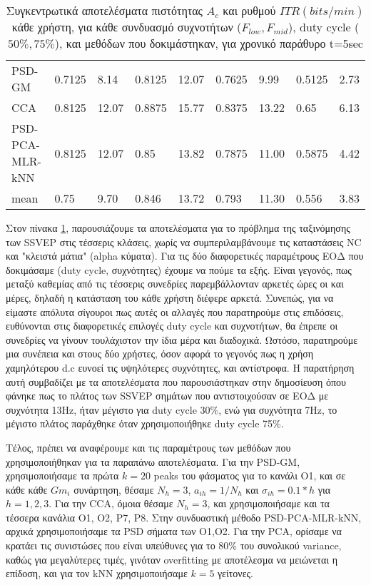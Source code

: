 \documentclass[11pt,a4paper,english,greek,twoside]{../Thesis}
\begin{document}
\begin{table}[H]
\begin{tabular}{ |p{4cm}||p{1cm}|p{1cm}|p{1cm}|p{1cm}|p{1cm}|p{1cm}|p{1cm}|p{1cm}|}
        PSD-GM          & 0.7125& 8.14&    0.8125& 12.07& 0.7625&  9.99&   0.5125&  2.73 \\
        CCA             & 0.8125& 12.07&   0.8875& 15.77& 0.8375& 13.22&   0.65&  6.13 \\
        PSD-PCA-MLR-kNN & 0.8125& 12.07&    0.85& 13.82&  0.7875& 11.00&  0.5875& 4.42 \\
        \hline
        mean            &  0.75&  9.70&   0.846& 13.72&   0.793& 11.30& 0.556& 3.83 \\
        \hline
    \end{tabular}
    \caption{Συγκεντρωτικά αποτελέσματα πιστότητας $A_c$ και ρυθμού $ITR (bits/min)$ κάθε χρήστη, για κάθε συνδυασμό συχνοτήτων ($F_{low}, F_{mid}$), duty cycle ($50\%, 75\%$), και μεθόδων που δοκιμάστηκαν, για χρονικό παράθυρο t=5sec}
    \label{tab:full_results}
\end{table}

\par Στον πίνακα \ref{tab:full_results}, παρουσιάζουμε τα αποτελέσματα για το πρόβλημα της ταξινόμησης των SSVEP στις τέσσερις κλάσεις, χωρίς να συμπεριλαμβάνουμε τις καταστάσεις NC και "κλειστά μάτια" (alpha κύματα). Για τις δύο διαφορετικές παραμέτρους ΕΟΔ που δοκιμάσαμε (duty cycle, συχνότητες) έχουμε να πούμε τα εξής. Είναι γεγονός, πως μεταξύ καθεμίας από τις τέσσερις συνεδρίες παρεμβάλλονταν αρκετές ώρες οι και μέρες, δηλαδή η κατάσταση του κάθε χρήστη διέφερε αρκετά. Συνεπώς, για να είμαστε απόλυτα σίγουροι πως αυτές οι αλλαγές που παρατηρούμε στις επιδόσεις, ευθύνονται στις διαφορετικές επιλογές duty cycle και συχνοτήτων, θα έπρεπε οι συνεδρίες να γίνουν τουλάχιστον την ίδια μέρα και διαδοχικά. Ωστόσο, παρατηρούμε μια συνέπεια και στους δύο χρήστες, όσον αφορά το γεγονός πως η χρήση χαμηλότερου d.c ευνοεί τις υψηλότερες συχνότητες, και αντίστροφα. Η παρατήρηση αυτή συμβαδίζει με τα αποτελέσματα που παρουσιάστηκαν στην δημοσίευση \cite{Huang2012-va} όπου φάνηκε πως το πλάτος των SSVEP σημάτων που αντιστοιχούσαν σε ΕΟΔ με συχνότητα 13Hz, ήταν μέγιστο για duty cycle 30\%, ενώ για συχνότητα 7Hz, το μέγιστο πλάτος παράχθηκε όταν χρησιμοποιήθηκε duty cycle 75\%. 

\par Τέλος, πρέπει να αναφέρουμε και τις παραμέτρους των μεθόδων που χρησιμοποιήθηκαν για τα παραπάνω αποτελέσματα. Για την PSD-GM, χρησιμοποιήσαμε τα πρώτα $k=20$ peaks του φάσματος για το κανάλι O1, και σε κάθε κάθε $Gm_i$ συνάρτηση, θέσαμε $N_h=3$, $a_{ih}=1/N_{h}$ και $\sigma_{ih}=0.1*h$ για $h=1,2,3$. Για την CCA, όμοια θέσαμε $N_h=3$, και χρησιμοποιήσαμε και τα τέσσερα κανάλια O1, O2, P7, P8. Στην συνδυαστική μέθοδο PSD-PCA-MLR-kNN, αρχικά χρησιμοποιήσαμε τα PSD σήματα των O1,O2. Για την PCA, ορίσαμε να κρατάει τις συνιστώσες που είναι υπεύθυνες για το 80\% του συνολικού variance, καθώς για μεγαλύτερες τιμές, γινόταν overfitting με αποτέλεσμα να μειώνεται η επίδοση, και για τον kNN χρησιμοποιήσαμε $k=5$ γείτονες.
\end{document}
